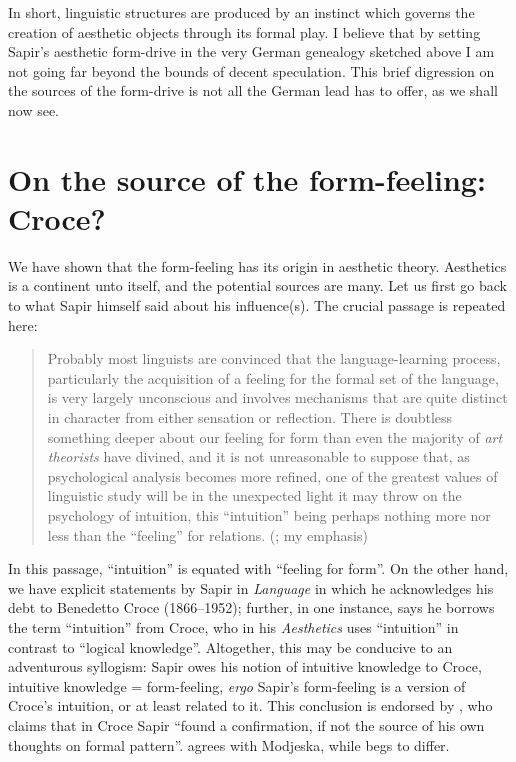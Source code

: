 \documentclass[output=paper]{langscibook}
\begin{document}
In short, linguistic structures are produced by an instinct which governs the creation of aesthetic objects through its formal play. I believe that by setting Sapir's aesthetic form-drive in the very German genealogy sketched above I am not going far beyond the bounds of decent speculation. This brief digression on the sources of the form-drive is not all the German lead has to offer, as we shall now see.

\section{On the source of the form-feeling: Croce?}
\label{sec:fortis:croce}

We have shown that the form-feeling has its origin in aesthetic theory. Aesthetics is a continent unto itself, and the potential sources are many. Let us first go back to what Sapir himself said about his influence(s). The crucial passage is repeated here:

\begin{quotation}
Probably most linguists are convinced that the language-learning process, particularly the acquisition of a feeling for the formal set of the language, is very largely unconscious and involves mechanisms that are quite distinct in character from either sensation or reflection. There is doubtless something deeper about our feeling for form than even the majority of \emph{art theorists} have divined, and it is not unreasonable to suppose that, as psychological analysis becomes more refined, one of the greatest values of linguistic study will be in the unexpected light it may throw on the psychology of intuition, this ``intuition'' being perhaps nothing more nor less than the ``feeling'' for relations. (\citealt[156]{Sapir1924}; my emphasis)
\end{quotation}

In this passage, ``intuition'' is equated with ``feeling for form''. On the other hand, we have explicit statements by Sapir in \emph{Language} in which he acknowledges his debt to Benedetto Croce (1866--1952); further, in one instance, \citet[224]{Sapir1921} says he borrows the term ``intuition'' from Croce, who in his \emph{Aesthetics} uses ``intuition'' in contrast to ``logical knowledge''. Altogether, this may be conducive to an adventurous syllogism: Sapir owes his notion of intuitive knowledge to Croce, intuitive knowledge = form-feeling, \emph{ergo} Sapir's form-feeling is a version of Croce's intuition, or at least related to it. This conclusion is endorsed by \citet[347]{Modjeska1968}, who claims that in Croce Sapir ``found a confirmation, if not the source of his own thoughts on formal pattern''. \citet{Hymes1969} agrees with Modjeska, while \citet{Hall1969} begs to differ.
\end{document}

